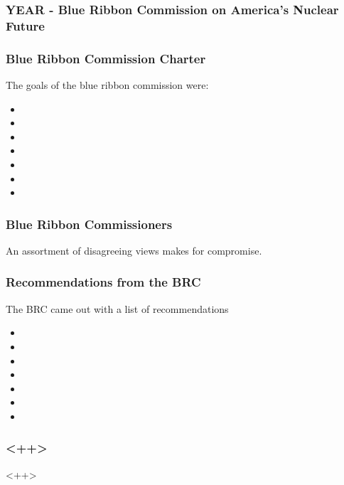 
\begin{frame}[ctb!]
    \frametitle{YEAR - Blue Ribbon Commission on America's Nuclear Future}

  \end{frame}
\begin{frame}[ctb!]
    \frametitle{Blue Ribbon Commission Charter}
    The goals of the blue ribbon commission were:
    \begin{itemize}
      \item <++>
      \item <++>
      \item <++>
      \item <++>
      \item <++>
      \item <++>
      \item <++>
    \end{itemize}

  \end{frame}

\begin{frame}[ctb!]
    \frametitle{Blue Ribbon Commissioners}
    An assortment of disagreeing views makes for compromise.
  \end{frame}

\begin{frame}[ctb!]
    \frametitle{Recommendations from the BRC}
    The BRC came out with a list of recommendations
    \begin{itemize}
      \item <++>
      \item <++>
      \item <++>
      \item <++>
      \item <++>
      \item <++>
      \item <++>
    \end{itemize}
  \end{frame}

\begin{frame}
    \frametitle{<++>}
  \end{frame}<++>


